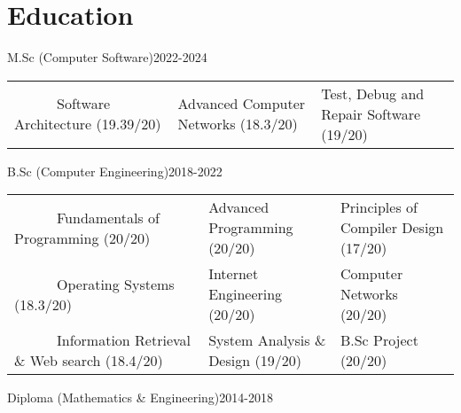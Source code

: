 \documentclass[11pt,a4paper,sans]{moderncv}
\begin{document}
\section{Education}

{M.Sc (Computer Software)}{2022-2024}{}{}
\small{
    \begin{tabular}
        {l@{\hskip 5mm}l@{\hskip 5mm}l}
        ~~~~~~Software Architecture (19.39/20) & Advanced Computer Networks (18.3/20) & Test, Debug and Repair Software (19/20) \\
    \end{tabular}
    \medskip
} %

\vspace{-0.2em}

\vspace{0.6em}

{B.Sc (Computer Engineering)}{2018-2022}{}{}
\small{
    \begin{tabular}
        {l@{\hskip 5mm}l@{\hskip 5mm}l}
        ~~~~~~Fundamentals of Programming (20/20) & Advanced Programming (20/20) & Principles of Compiler Design (17/20) \\
        ~~~~~~Operating Systems (18.3/20) & Internet Engineering (20/20) &  Computer Networks (20/20) \\
        ~~~~~~Information Retrieval \& Web search (18.4/20) & System Analysis \& Design (19/20) & B.Sc Project (20/20) 
        
    \end{tabular}
    \medskip
} %

\vspace{-0.5em}


\vspace{0.6em}
{Diploma (Mathematics \& Engineering)}{2014-2018}{}{}
\end{document}
